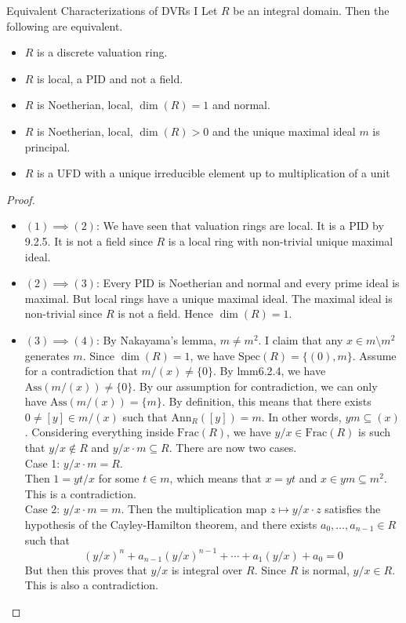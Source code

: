 \documentclass[a4paper]{article}
\begin{document}
\begin{prp}{Equivalent Characterizations of DVRs I}{} Let $R$ be an integral domain. Then the following are equivalent. 
\begin{itemize}
\item $R$ is a discrete valuation ring. 
\item $R$ is local, a PID and not a field. 
\item $R$ is Noetherian, local, $\dim(R)=1$ and normal. 
\item $R$ is Noetherian, local, $\dim(R)>0$ and the unique maximal ideal $m$ is principal. 
\item $R$ is a UFD with a unique irreducible element up to multiplication of a unit
\end{itemize} 
\begin{proof}~\\
\begin{itemize}
\item $(1)\implies(2)$: We have seen that valuation rings are local. It is a PID by 9.2.5. It is not a field since $R$ is a local ring with non-trivial unique maximal ideal. 
\item $(2)\implies(3)$: Every PID is Noetherian and normal and every prime ideal is maximal. But local rings have a unique maximal ideal. The maximal ideal is non-trivial since $R$ is not a field. Hence $\dim(R)=1$. 
\item $(3)\implies(4)$: By Nakayama's lemma, $m\neq m^2$. I claim that any $x\in m\setminus m^2$ generates $m$. Since $\dim(R)=1$, we have $\text{Spec}(R)=\{(0),m\}$. Assume for a contradiction that $m/(x)\neq\{0\}$. By lmm6.2.4, we have $\text{Ass}(m/(x))\neq\{0\}$. By our assumption for contradiction, we can only have $\text{Ass}(m/(x))=\{m\}$. By definition, this means that there exists $0\neq [y]\in m/(x)$ such that $\text{Ann}_R([y])=m$. In other words, $ym\subseteq(x)$. Considering everything inside $\text{Frac}(R)$, we have $y/x\in\text{Frac}(R)$ is such that $y/x\notin R$ and $y/x\cdot m\subseteq R$. There are now two cases. \\

Case 1: $y/x\cdot m=R$. \\
Then $1=yt/x$ for some $t\in m$, which means that $x=yt$ and $x\in ym\subseteq m^2$. This is a contradiction. \\

Case 2: $y/x\cdot m=m$. Then the multiplication map $z\mapsto y/x\cdot z$ satisfies the hypothesis of the Cayley-Hamilton theorem, and there exists $a_0,\dots,a_{n-1}\in R$ such that $$(y/x)^n+a_{n-1}(y/x)^{n-1}+\cdots+a_1(y/x)+a_0=0$$ But then this proves that $y/x$ is integral over $R$. Since $R$ is normal, $y/x\in R$. This is also a contradiction. \\


\end{itemize}
\end{proof}
\end{prp}
\end{document}
